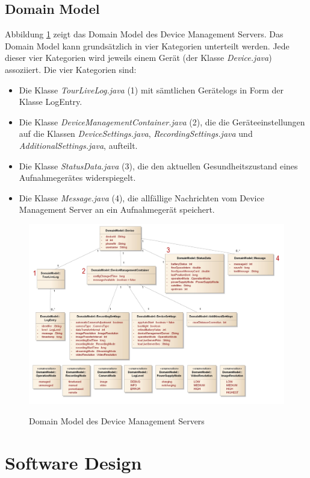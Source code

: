 \subsection{Domain Model}
Abbildung \ref{fig:domainmodeldevmgmtsrv} zeigt das Domain Model des Device Management Servers. Das Domain Model kann grundsätzlich in vier Kategorien unterteilt werden. Jede dieser vier Kategorien wird jeweils einem Gerät (der Klasse \textit{Device.java}) assoziiert. Die vier Kategorien sind: 


\begin{itemize}
\item Die Klasse \textit{TourLiveLog.java} (1) mit sämtlichen Gerätelogs in Form der Klasse LogEntry. 
\item Die Klasse \textit{DeviceManagementContainer.java} (2), die die Geräteeinstellungen auf die Klassen \textit{DeviceSettings.java}, \textit{RecordingSettings.java} und \textit{AdditionalSettings.java}, aufteilt.
\item Die Klasse \textit{StatusData.java} (3), die den aktuellen Gesundheitszustand eines Aufnahmegerätes widerspiegelt.
\item Die Klasse \textit{Message.java} (4), die allfällige Nachrichten vom Device Management Server an ein Aufnahmegerät speichert.
\end{itemize}

\begin{figure}[H]
	\centering
	\includegraphics[width=130mm]{images/devmgmtsrv/domainmodel.jpg}
	\label{fig:domainmodeldevmgmtsrv}
	\caption{Domain Model des Device Management Servers}
\end{figure}


\section{Software Design}
